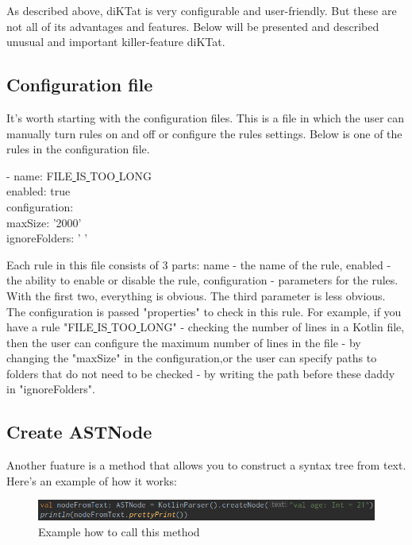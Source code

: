 \par As described above, diKTat is very configurable and user-friendly. But these are not all of its advantages and features. Below will be presented and described unusual and important killer-feature diKTat.

\subsection{Configuration file}
\par
It's worth starting with the configuration files. This is a file in which the user can manually turn rules on and off or configure the rules settings. Below is one of the rules in the configuration file.
\begin{center}
- name: FILE\underline{ }IS\underline{ }TOO\underline{ }LONG\\
	enabled: true\\
	configuration:\\
	maxSize: '2000'\\
	ignoreFolders: ' '\\
\end{center}
Each rule in this file consists of 3 parts: name - the name of the rule, enabled - the ability to enable or disable the rule, configuration - parameters for the rules. With the first two, everything is obvious. The third parameter is less obvious. The configuration is passed "properties" to check in this rule. For example, if you have a rule "FILE\underline{ }IS\underline{ }TOO\underline{ }LONG" - checking the number of lines in a Kotlin file, then the user can configure the maximum number of lines in the file - by changing the "maxSize" in the configuration,or the user can specify paths to folders that do not need to be checked - by writing the path before these daddy in "ignoreFolders". \\

\subsection{Create ASTNode}
\par
Another fuature is a method that allows you to construct a syntax tree from text. Here's an example of how it works:

\begin{figure}[H]
  \centering
  \includegraphics[scale=0.5]{wp/pictures/code.png}
  \caption{Example how to call this method}   
\end{figure}


